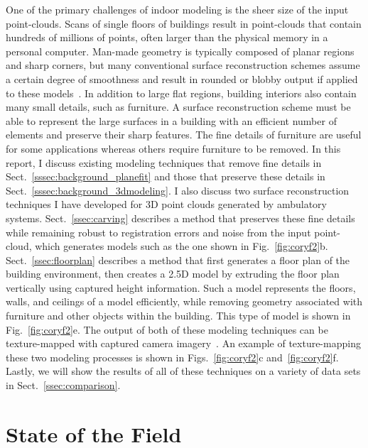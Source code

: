 \documentclass[journal]{IEEEtran}
\begin{document}
One of the primary challenges of indoor modeling is the sheer size of the input point-clouds.  Scans of single floors of buildings result in point-clouds that contain hundreds of millions of points, often larger than the physical memory in a personal computer.  Man-made geometry is typically composed of planar regions and sharp corners, but many conventional surface reconstruction schemes assume a certain degree of smoothness and result in rounded or blobby output if applied to these models~\cite{Powercrust,OctreeSculpting,Carving,ProgressiveMesh,Poisson,Eigencrust}.  In addition to large flat regions, building interiors also contain many small details, such as furniture.  A surface reconstruction scheme must be able to represent the large surfaces in a building with an efficient number of elements and preserve their sharp features.  The fine details of furniture are useful for some applications whereas others require furniture to be removed.  In this report, I discuss existing modeling techniques that remove fine details in Sect.~\ref{sssec:background_planefit} and those that preserve these details in Sect.~\ref{sssec:background_3dmodeling}.  I also discuss two surface reconstruction techniques I have developed for 3D point clouds generated by ambulatory systems.  Sect.~\ref{ssec:carving} describes a method that preserves these fine details while remaining robust to registration errors and noise from the input point-cloud, which generates models such as the one shown in Fig.~\ref{fig:coryf2}b.  Sect.~\ref{ssec:floorplan} describes a method that first generates a floor plan of the building environment, then creates a 2.5D model by extruding the floor plan vertically using captured height information.  Such a model represents the floors, walls, and ceilings of a model efficiently, while removing geometry associated with furniture and other objects within the building.  This type of model is shown in Fig.~\ref{fig:coryf2}e.  The output of both of these modeling techniques can be texture-mapped with captured camera imagery~\cite{Cheng14}.  An example of texture-mapping these two modeling processes is shown in Figs.~\ref{fig:coryf2}c and~\ref{fig:coryf2}f.  Lastly, we will show the results of all of these techniques on a variety of data sets in Sect.~\ref{ssec:comparison}.

\section{State of the Field}
\label{sec:background}
\end{document}
